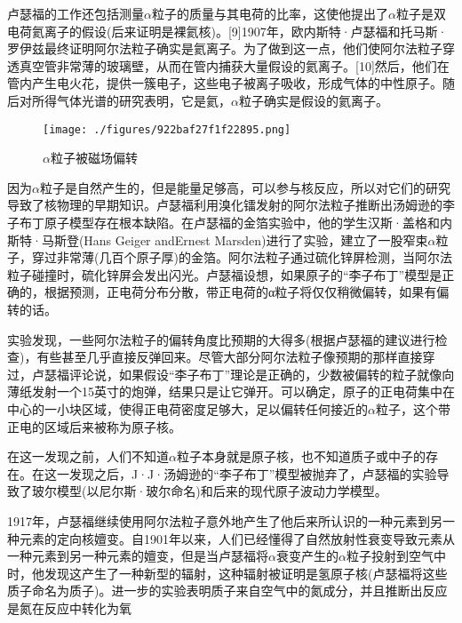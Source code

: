 卢瑟福的工作还包括测量$\alpha$粒子的质量与其电荷的比率，这使他提出了$\alpha$粒子是双电荷氦离子的假设(后来证明是裸氦核)。[9]1907年，欧内斯特·卢瑟福和托马斯·罗伊兹最终证明阿尔法粒子确实是氦离子。为了做到这一点，他们使阿尔法粒子穿透真空管非常薄的玻璃壁，从而在管内捕获大量假设的氦离子。[10]然后，他们在管内产生电火花，提供一簇电子，这些电子被离子吸收，形成气体的中性原子。随后对所得气体光谱的研究表明，它是氦，$\alpha$粒子确实是假设的氦离子。
\begin{figure}[ht]
\centering
\texttt{[image: ./figures/922baf27f1f22895.png]}
\caption{$\alpha$粒子被磁场偏转} \label{fig_ALZ_4}
\end{figure}
因为$\alpha$粒子是自然产生的，但是能量足够高，可以参与核反应，所以对它们的研究导致了核物理的早期知识。卢瑟福利用溴化镭发射的阿尔法粒子推断出汤姆逊的李子布丁原子模型存在根本缺陷。在卢瑟福的金箔实验中，他的学生汉斯·盖格和内斯特·马斯登(Hans Geiger andErnest Marsden)进行了实验，建立了一股窄束$\alpha$粒子，穿过非常薄(几百个原子厚)的金箔。阿尔法粒子通过硫化锌屏检测，当阿尔法粒子碰撞时，硫化锌屏会发出闪光。卢瑟福设想，如果原子的“李子布丁”模型是正确的，根据预测，正电荷分布分散，带正电荷的α粒子将仅仅稍微偏转，如果有偏转的话。

实验发现，一些阿尔法粒子的偏转角度比预期的大得多(根据卢瑟福的建议进行检查)，有些甚至几乎直接反弹回来。尽管大部分阿尔法粒子像预期的那样直接穿过，卢瑟福评论说，如果假设“李子布丁”理论是正确的，少数被偏转的粒子就像向薄纸发射一个15英寸的炮弹，结果只是让它弹开。可以确定，原子的正电荷集中在中心的一小块区域，使得正电荷密度足够大，足以偏转任何接近的$\alpha$粒子，这个带正电的区域后来被称为原子核。

在这一发现之前，人们不知道$\alpha$粒子本身就是原子核，也不知道质子或中子的存在。在这一发现之后，J·J·汤姆逊的“李子布丁”模型被抛弃了，卢瑟福的实验导致了玻尔模型(以尼尔斯·玻尔命名)和后来的现代原子波动力学模型。

1917年，卢瑟福继续使用阿尔法粒子意外地产生了他后来所认识的一种元素到另一种元素的定向核嬗变。自1901年以来，人们已经懂得了自然放射性衰变导致元素从一种元素到另一种元素的嬗变，但是当卢瑟福将$\alpha$衰变产生的$\alpha$粒子投射到空气中时，他发现这产生了一种新型的辐射，这种辐射被证明是氢原子核(卢瑟福将这些质子命名为质子)。进一步的实验表明质子来自空气中的氮成分，并且推断出反应是氮在反应中转化为氧